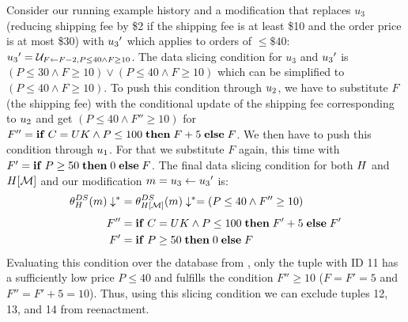 \begin{exam}\label{ex:ds-example}
Consider our running example history and a modification that replaces $u_3$ (reducing shipping fee by \$2 if the shipping fee is at least \$10 and the order price is at most \$30) with ${u_3}'$ which applies to orders of $\leq \$40$: ${u_3}' = \mathcal{U}_{F \gets F-2,P \leq 40 \land F \geq 10}$.
The data slicing condition for $u_3$ and ${u_3}'$ is $(P \leq 30 \land F \geq 10) \vee (P \leq 40 \land F \geq 10)$ which can be simplified to $(P \leq 40 \land F \geq 10)$. To push this condition through $u_2$, we have to substitute $F$ (the shipping fee) with the conditional update of the shipping fee corresponding to $u_2$ and get
$(P \leq 40 \land F'' \geq 10)$ for $F'' = \mathbf{if}\thickspace C=UK \land P \leq 100 \thickspace \mathbf{then} \thickspace F+5 \thickspace \mathbf{else} \thickspace F$. We then have to push this condition through $u_1$. For that we substitute $F$ again, this time with $F' = \mathbf{if}\thickspace P \geq 50 \thickspace \mathbf{then} \thickspace 0 \thickspace \mathbf{else} \thickspace F$. The final data slicing condition for both $H$ and $H[\mathcal{M}]$ and our modification $m = u_3 \gets {u_3}'$ is:
%
\begin{align*}
{\theta_{H}^{DS}(m)}\downarrow^{\ast} &= {\theta_{H[\mathcal{M}]}^{DS}(m)}\downarrow^{\ast} = (P \leq 40 \land F'' \geq 10)\\[1mm]
F'' &= \mathbf{if}\thickspace C=UK \land P \leq 100 \thickspace \mathbf{then} \thickspace F'+5 \thickspace \mathbf{else} \thickspace F'\\
  F' &= \mathbf{if}\thickspace P \geq 50 \thickspace \mathbf{then} \thickspace 0 \thickspace \mathbf{else} \thickspace F
\end{align*}
Evaluating this condition over the database from , only the tuple with ID 11 has a sufficiently low price $P \leq 40$ and fulfills the condition $F'' \geq 10$ ($F = F' = 5$ and $F'' = F'+5 = 10$). Thus, using this slicing condition we can exclude tuples 12, 13, and 14 from reenactment.

\end{exam}

